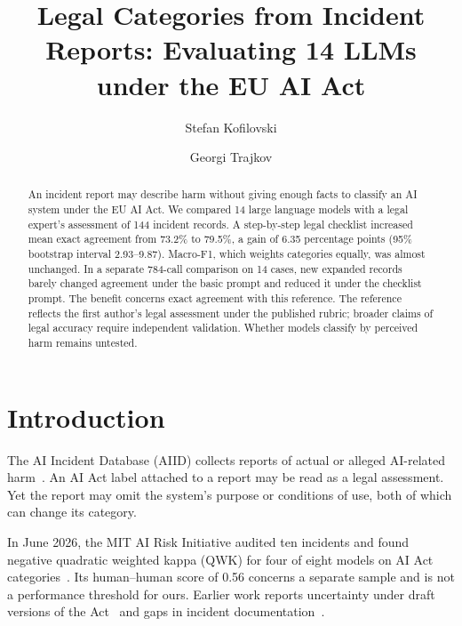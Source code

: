 \documentclass[sigconf,natbib=false,language=english]{acmart}
\begin{document}
\title[Legal Categories from Incident Reports]{Legal Categories from Incident Reports: Evaluating 14 LLMs under the EU AI Act}
\author{Stefan Kofilovski}
\author{Georgi Trajkov}

\begin{abstract}
An incident report may describe harm without giving enough facts to classify an AI system under the EU AI Act. We compared 14 large language models with a legal expert's assessment of 144 incident records. A step-by-step legal checklist increased mean exact agreement from 73.2\% to 79.5\%, a gain of 6.35 percentage points (95\% bootstrap interval 2.93--9.87). Macro-F1, which weights categories equally, was almost unchanged. In a separate 784-call comparison on 14 cases, new expanded records barely changed agreement under the basic prompt and reduced it under the checklist prompt. The benefit concerns exact agreement with this reference. The reference reflects the first author's legal assessment under the published rubric; broader claims of legal accuracy require independent validation. Whether models classify by perceived harm remains untested.
\end{abstract}
\maketitle

\section{Introduction}
The AI Incident Database (AIID) collects reports of actual or alleged AI-related harm~\cite{mcgregor2021}. An AI Act label attached to a report may be read as a legal assessment. Yet the report may omit the system's purpose or conditions of use, both of which can change its category.

In June 2026, the MIT AI Risk Initiative audited ten incidents and found negative quadratic weighted kappa (QWK) for four of eight models on AI Act categories~\cite{mit_tracker_2026}. Its human--human score of 0.56 concerns a separate sample and is not a performance threshold for ours. Earlier work reports uncertainty under draft versions of the Act~\cite{appliedai} and gaps in incident documentation~\cite{paeth2025}.
\end{document}
